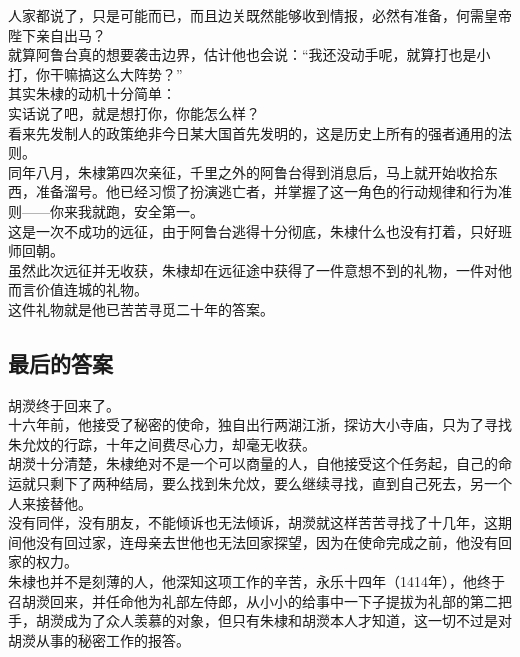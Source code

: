 \begin{multicols}{\theparacolNo}
人家都说了，只是可能而已，而且边关既然能够收到情报，必然有准备，何需皇帝陛下亲自出马？\\

就算阿鲁台真的想要袭击边界，估计他也会说：“我还没动手呢，就算打也是小打，你干嘛搞这么大阵势？”\\

其实朱棣的动机十分简单：\\

实话说了吧，就是想打你，你能怎么样？\\

看来先发制人的政策绝非今日某大国首先发明的，这是历史上所有的强者通用的法则。\\

同年八月，朱棣第四次亲征，千里之外的阿鲁台得到消息后，马上就开始收拾东西，准备溜号。他已经习惯了扮演逃亡者，并掌握了这一角色的行动规律和行为准则——你来我就跑，安全第一。\\

这是一次不成功的远征，由于阿鲁台逃得十分彻底，朱棣什么也没有打着，只好班师回朝。\\

虽然此次远征并无收获，朱棣却在远征途中获得了一件意想不到的礼物，一件对他而言价值连城的礼物。\\

这件礼物就是他已苦苦寻觅二十年的答案。\\

\subsection{最后的答案}
胡濙终于回来了。\\

十六年前，他接受了秘密的使命，独自出行两湖江浙，探访大小寺庙，只为了寻找朱允炆的行踪，十年之间费尽心力，却毫无收获。\\

胡濙十分清楚，朱棣绝对不是一个可以商量的人，自他接受这个任务起，自己的命运就只剩下了两种结局，要么找到朱允炆，要么继续寻找，直到自己死去，另一个人来接替他。\\

没有同伴，没有朋友，不能倾诉也无法倾诉，胡濙就这样苦苦寻找了十几年，这期间他没有回过家，连母亲去世他也无法回家探望，因为在使命完成之前，他没有回家的权力。\\

朱棣也并不是刻薄的人，他深知这项工作的辛苦，永乐十四年（1414年），他终于召胡濙回来，并任命他为礼部左侍郎，从小小的给事中一下子提拔为礼部的第二把手，胡濙成为了众人羡慕的对象，但只有朱棣和胡濙本人才知道，这一切不过是对胡濙从事的秘密工作的报答。\\


\end{multicols}
